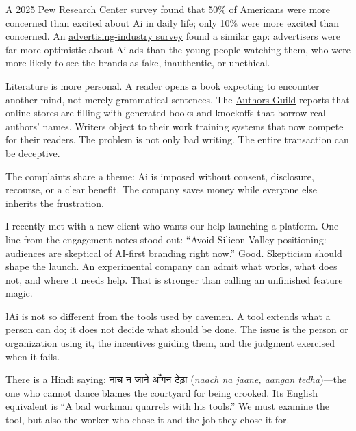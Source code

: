 \documentclass{news}
\begin{document}
A 2025 \href{https://www.pewresearch.org/science/2025/09/17/how-americans-view-ai-and-its-impact-on-people-and-society/}{Pew Research Center survey} found that 50\% of Americans were more concerned than excited about Ai in daily life; only 10\% were more excited than concerned. An \href{https://www.iab.com/insights/why-young-consumers-avoid-gen-ai-ads/}{advertising-industry survey} found a similar gap: advertisers were far more optimistic about Ai ads than the young people watching them, who were more likely to see the brands as fake, inauthentic, or unethical.

Literature is more personal. A reader opens a book expecting to encounter another mind, not merely grammatical sentences. The \href{https://authorsguild.org/app/uploads/2026/03/2025-Authors-Guild-Annual-Report.pdf}{Authors Guild} reports that online stores are filling with generated books and knockoffs that borrow real authors' names. Writers object to their work training systems that now compete for their readers. The problem is not only bad writing. The entire transaction can be deceptive.

The complaints share a theme: Ai is imposed without consent, disclosure, recourse, or a clear benefit. The company saves money while everyone else inherits the frustration.

I recently met with a new client who wants our help launching a platform. One line from the engagement notes stood out: ``Avoid Silicon Valley positioning: audiences are skeptical of AI-first branding right now.'' Good. Skepticism should shape the launch. An experimental company can admit what works, what does not, and where it needs help. That is stronger than calling an unfinished feature magic.


{\l{A}i is not so different from the tools used by cavemen. A tool extends what a person can do; it does not decide what should be done. The issue is the person or organization using it, the incentives guiding them, and the judgment exercised when it fails.
\par}

There is a Hindi saying: \href{https://www.rekhtadictionary.com/meaning-of-naach-na-jaane-aangan-tedhaa?lang=hi}{{\devanagari नाच न जाने आँगन टेढ़ा} (\emph{naach na jaane, aangan tedha})}---the one who cannot dance blames the courtyard for being crooked. Its English equivalent is ``A bad workman quarrels with his tools.'' We must examine the tool, but also the worker who chose it and the job they chose it for.
\end{document}
